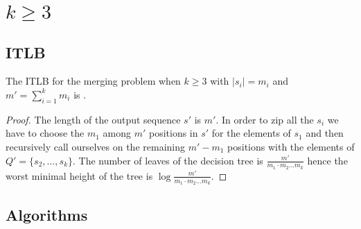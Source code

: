\section{$k\geq3$}
\label{tree:merging:kgeq3}


\subsection{ITLB}
\label{tree:merging:kgeq3:ITLB}


\begin{theorem}
The ITLB for the merging problem when $k \geq 3$ with $|s_i| = m_i$ and $m' = \sum_{i=1}^{k} m_i$ is .
\end{theorem}

\begin{proof}
The length of the output sequence $s'$ is $m'$. In order to zip all the $s_i$ we have to choose the $m_1$ among $m'$ positions in $s'$ for the elements of $s_1$ and then recursively call ourselves on the remaining $m'-m_1$ positions with the elements of $Q' = \{s_2, \dots, s_k\}$. The number of leaves of the decision tree is $\frac{m'}{m_1 \cdot m_2 \dots m_k}$ hence the worst minimal height of the tree is $\log \frac{m'}{m_1 \cdot m_2 \dots m_k}$.
\end{proof}


\subsection{Algorithms}
\label{tree:merging:kgeq3:alg}